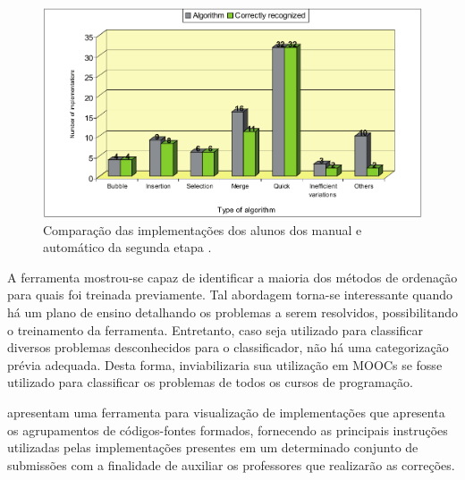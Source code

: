 		\begin{figure}[ht]
			\centering
			\includegraphics[scale=0.33]{imagem/clusterAutomatico.png}
			\caption[Comparação das implementações dos alunos dos 
			manual e automático da segunda etapa]{Comparação das implementações dos alunos dos 
			manual e automático da segunda etapa \cite{Taherkhani:2012}.}
			\label{fig:clusterAutomatico}
		\end{figure}
		
		A ferramenta mostrou-se capaz de identificar a maioria dos métodos de ordenação
		para quais foi treinada previamente. Tal abordagem torna-se interessante quando
		há um plano de ensino detalhando os problemas a serem resolvidos, possibilitando
		o treinamento da ferramenta. Entretanto, caso seja utilizado para classificar
		diversos problemas desconhecidos para o classificador, não há uma categorização
		prévia adequada. Desta forma, inviabilizaria sua utilização em MOOCs se fosse
		utilizado para classificar os problemas de todos os cursos de programação.
		
		 apresentam uma ferramenta para visualização de
		implementações que apresenta os agrupamentos de códigos-fontes formados,
		fornecendo as principais instruções utilizadas pelas implementações presentes
		em um determinado conjunto de submissões com a finalidade de auxiliar os
		professores que realizarão as correções.
		
		
